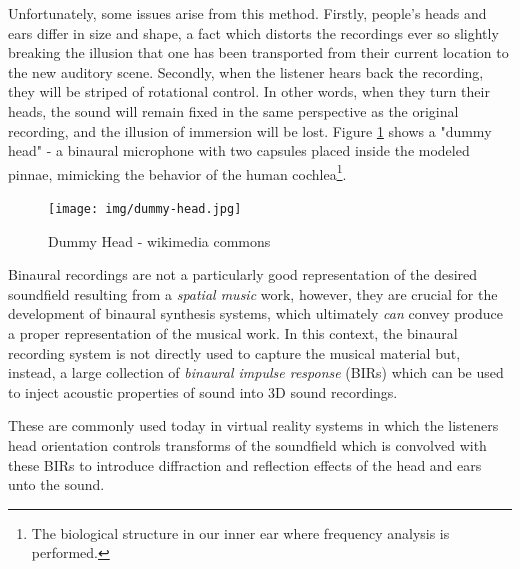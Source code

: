 Unfortunately, some issues arise from this method. Firstly, people's heads and ears differ in size and shape, a fact which distorts the recordings ever so slightly breaking the illusion that one has been transported from their current location to the new auditory scene. Secondly, when the listener hears back the recording, they will be striped of rotational control. In other words, when they turn their heads, the sound will remain fixed in the same perspective as the original recording, and the illusion of immersion will be lost. Figure \ref{fig:dummy-head} shows a "dummy head" - a binaural microphone with two capsules placed inside the modeled pinnae, mimicking the behavior of the human cochlea\footnote{The biological structure in our inner ear where frequency analysis is performed.}.

\begin{figure}[h!]%
\centering
\texttt{[image: img/dummy-head.jpg]} 
\label{fig:dummy-head}
\caption{Dummy Head - wikimedia commons}
\end{figure}

Binaural recordings are not a particularly good representation of the desired soundfield resulting from a \textit{spatial music} work, however, they are crucial for the development of binaural synthesis systems, which ultimately \textit{can} convey produce a proper representation of the musical work. In this context, the binaural recording system is not directly used to capture the musical material but, instead, a large collection of \textit{binaural impulse response} (BIRs) which can be used to inject acoustic properties of sound into 3D sound recordings. 

These are commonly used today in virtual reality systems in which the listeners head orientation controls transforms of the soundfield which is convolved with these BIRs to introduce diffraction and reflection effects of the head and ears unto the sound. 


